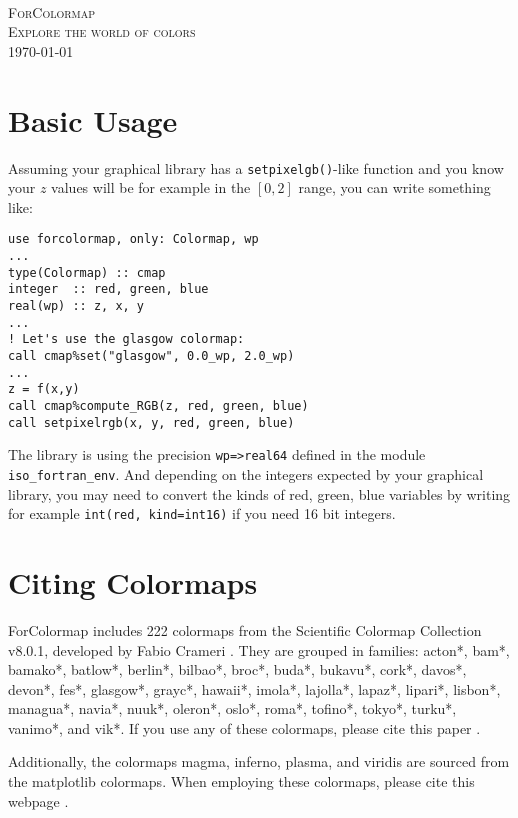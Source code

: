 \documentclass[a4paper]{article}
\begin{document}
\begin{titlepage}
	\centering
	\\
	\vspace{1cm}
	{\scshape\LARGE ForColormap}\\
	\vspace{1.5cm}
	{\scshape\Large Explore the world of colors}\\
	\vfill
	{\large \today}\\
\end{titlepage}
\newpage
\tableofcontents
\listoftables
\newpage
\section{Basic Usage}
Assuming your graphical library has a \texttt{setpixelgb()}-like function and you know your $z$ values will be for example in the $[0, 2]$ range, you can write something like:
\begin{lstlisting}[style=fortran]
use forcolormap, only: Colormap, wp
...
type(Colormap) :: cmap
integer  :: red, green, blue
real(wp) :: z, x, y
...
! Let's use the glasgow colormap:
call cmap%set("glasgow", 0.0_wp, 2.0_wp)
...
z = f(x,y)
call cmap%compute_RGB(z, red, green, blue)
call setpixelrgb(x, y, red, green, blue)
\end{lstlisting}

The library is using the precision \texttt{wp=>real64} defined in the module \texttt{iso\_fortran\_env}. And depending on the integers expected by your graphical library, you may need to convert the kinds of red, green, blue variables by writing for example \texttt{int(red, kind=int16)} if you need 16 bit integers.


\section{Citing Colormaps}
ForColormap includes 222 colormaps from the Scientific Colormap Collection v8.0.1, developed by Fabio Crameri \cite{crameri_2023_8409685}. They are grouped in families: acton*, bam*, bamako*, batlow*, berlin*, bilbao*, broc*, buda*, bukavu*, cork*, davos*, devon*, fes*, glasgow*, grayc*, hawaii*, imola*, lajolla*, lapaz*, lipari*, lisbon*, managua*, navia*, nuuk*, oleron*, oslo*, roma*, tofino*, tokyo*, turku*, vanimo*, and vik*. If you use any of these colormaps, please cite this paper  \cite{Crameri2020}.

Additionally, the colormaps magma, inferno, plasma, and viridis are sourced from the matplotlib colormaps. When employing these colormaps, please cite this webpage \cite{mpl_colormaps}.
\end{document}

